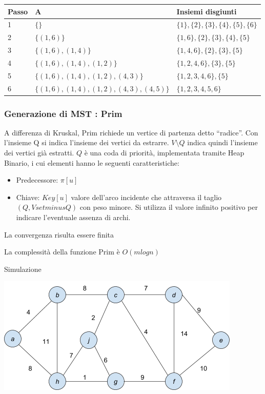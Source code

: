 \documentclass[11pt,a4paper,twoside,openright]{book}
\providecommand{\tightlist}{\setlength{\itemsep}{0pt}\setlength{\parskip}{0pt}}
\begin{document}
{{\begin{tabular}{|l|l|l|}
\hline 
Passo & A & Insiemi disgiunti \\ 
\hline 
1 & $\{\}$ & $\{1\},\{2\},\{3\},\{4\},\{5\},\{6\}$ \\ 
\hline 
2 & $\{(1,6)\}$ & $\{1,6\},\{2\},\{3\},\{4\},\{5\}$ \\ 
\hline 
3 & $\{(1,6),(1,4)\}$ & $\{1,4,6\},\{2\},\{3\},\{5\}$ \\ 
\hline 
4 & $\{(1,6),(1,4),(1,2)\}$ & $\{1,2,4,6\},\{3\},\{5\}$ \\ 
\hline 
5 & $\{(1,6),(1,4),(1,2),(4,3)\}$ & $\{1,2,3,4,6\},\{5\}$ \\ 
\hline 
6 & $\{(1,6),(1,4),(1,2),(4,3),(4,5)\}$ & $\{1,2,3,4,5,6\}$ \\ 
\hline 
\end{tabular} 

\subsubsection{Generazione di MST : Prim}

{A differenza di Kruskal, Prim richiede un vertice di partenza detto ``radice''. Con l'insieme Q si indica l'insieme dei vertici da estrarre.
$V\setminus Q$ indica quindi l'insieme dei vertici già estratti. $Q$ è una coda di priorità, implementata tramite Heap Binario, i cui elementi hanno le seguenti caratteristiche:}

\begin{itemize}
\tightlist
\item
  Predecessore: $\pi[u]$
\item
Chiave: $Key[u]$ valore dell'arco incidente che attraversa il taglio $(Q,Vsetminus Q)$ con peso minore. Si utilizza il valore infinito positivo per indicare l'eventuale assenza di archi.
\end{itemize}



La convergenza risulta essere finita

La complessità della funzione Prim è $O(m logn)$

{Simulazione}

{\includegraphics{images/image542.png}}

}}
\end{document}
